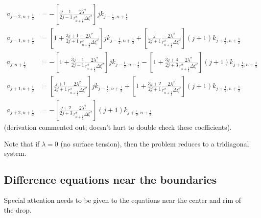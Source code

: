 \documentclass[12pt]{article}
\numberwithin{equation}{section}
\begin{document}
\begin{align}
	a_{j-2,n+\frac{1}{2}}
	&=
	-\left[ \frac{j-1}{2j - 1} \frac{2\lambda^2}{r_{n+\frac{1}{2}}^2 \Delta \xi^2} \right] j k_{j-\frac{1}{2},n+\frac{1}{2}}
	\\
	a_{j-1,n+\frac{1}{2}}
	&=
	\left[
		1 + \frac{3j+1}{2j + 1}
		\frac{2\lambda^2}{r_{n+\frac{1}{2}}^2 \Delta \xi^2}
	\right] jk_{j-\frac{1}{2},n+\frac{1}{2}}
	+
	\left[
		\frac{j}{2j + 1}\frac{2\lambda^2}{r_{n+\frac{1}{2}}^2 \Delta \xi^2}
	\right] (j+1) k_{j+\frac{1}{2},n+\frac{1}{2}}
	\\
	a_{j,n+\frac{1}{2}}
	&=
	-  \left[
		1 + \frac{3j - 1}{2j - 1}
		\frac{2\lambda^2}{r_{n+\frac{1}{2}}^2 \Delta \xi^2}
	\right]
	j k_{j-\frac{1}{2},n+\frac{1}{2}}
	-
	\left[
		1 + \frac{3j + 4}{2j + 3} \frac{2\lambda^2}{r_{n+\frac{1}{2}}^2 \Delta \xi^2} 
	\right](j+1) k_{j+\frac{1}{2},n+\frac{1}{2}}
	\\
	a_{j+1,n+\frac{1}{2}}
	&=
	\left[
		\frac{j + 1}{2j + 1} \frac{2 \lambda^2}{r_{n+\frac{1}{2}}^2 \Delta \xi^2}
	\right] jk_{j-\frac{1}{2},n+\frac{1}{2}}
	+
	\left[
		1 + \frac{3j+2}{2j + 1} \frac{2\lambda^2}{r_{n+\frac{1}{2}}^2 \Delta \xi^2}
	\right] (j+1)k_{j+\frac{1}{2},n+\frac{1}{2}}
	\\
	a_{j+2,n+\frac{1}{2}}
	&=
	-
	\left[
		\frac{j+2}{2j +3} \frac{2\lambda^2}{r_{n+\frac{1}{2}}^2 \Delta \xi^2}
	\right](j+1)k_{j+\frac{1}{2},n+\frac{1}{2}}
\end{align}
(derivation  commented out; doesn't hurt to double check these coefficients).

Note that if $\lambda = 0$ (no surface tension), then the problem reduces to a tridiagonal system.


\subsection{Difference equations near the boundaries}

Special attention needs to be given to the equations near the center and rim of the drop.
\end{document}
